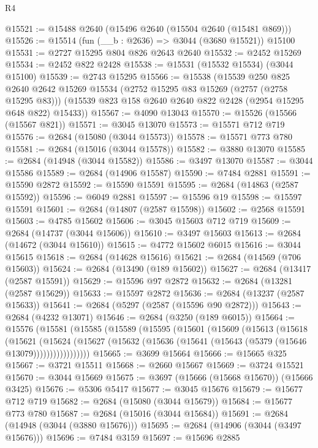 \begin{lexlean}{R4}
\begin{coremodule}
@15521 := @15488 @2640 (@15496 @2640 (@15504 @2640 (@15481 @869)))
@15526 := @15514 (fun (__b : @2636) => @3044 (@3680 @15521)) @15100
@15531 := @2727 @15295 @804 @826 @2643 @2640
@15532 := @2452 @15269
@15534 := @2452 @822 @2428
@15538 := @15531 (@15532 @15534) (@3044 @15100)
@15539 := @2743 @15295
@15566 := @15538
    (@15539
      @250
      @825
      @2640
      @2642
      @15269
      @15534
      (@2752 @15295 @83 @15269 (@2757 (@2758 @15295 @83)))
      (@15539 @823 @158 @2640 @2640 @822 @2428 (@2954 @15295 @648 @822) @15433))
@15567 := @4090 @13043
@15570 := @15526 (@15566 (@15567 @821))
@15571 := @3045 @13070
@15573 := @15571 @712 @719
@15576 := @2684 (@15080 (@3044 @15573))
@15578 := @15571 @773 @780
@15581 := @2684 (@15016 (@3044 @15578))
@15582 := @3880 @13070
@15585 := @2684 (@14948 (@3044 @15582))
@15586 := @3497 @13070
@15587 := @3044 @15586
@15589 := @2684 (@14906 @15587)
@15590 := @7484 @2881
@15591 := @15590 @2872
@15592 := @15590 @15591
@15595 := @2684 (@14863 (@2587 @15592))
@15596 := @6049 @2881
@15597 := @15596 @19
@15598 := @15597 @15591
@15601 := @2684 (@14807 (@2587 @15598))
@15602 := @2568 @15591
@15603 := @4785 @15602
@15606 := @3045 @15603 @712 @719
@15609 := @2684 (@14737 (@3044 @15606))
@15610 := @3497 @15603
@15613 := @2684 (@14672 (@3044 @15610))
@15615 := @4772 @15602 @6015
@15616 := @3044 @15615
@15618 := @2684 (@14628 @15616)
@15621 := @2684 (@14569 (@706 @15603))
@15624 := @2684 (@13490 (@189 @15602))
@15627 := @2684 (@13417 (@2587 @15591))
@15629 := @15596 @97 @2872
@15632 := @2684 (@13281 (@2587 @15629))
@15633 := @15597 @2872
@15636 := @2684 (@13237 (@2587 @15633))
@15641 := @2684 (@5297 (@2587 (@15596 @90 @2872)))
@15643 := @2684 (@4232 @13071)
@15646 := @2684 (@3250 (@189 @6015))
@15664 := @15576
    (@15581
      (@15585
        (@15589
          (@15595
            (@15601
              (@15609
                (@15613
                  (@15618
                    (@15621
                      (@15624
                        (@15627
                          (@15632 (@15636 (@15641 (@15643 (@5379 (@15646 @13079)))))))))))))))))
@15665 := @3699 @15664
@15666 := @15665 @325
@15667 := @3721 @15511
@15668 := @2660 @15667
@15669 := @3724 @15521
@15670 := @3044 @15669
@15675 := @3697 (@15666 (@15668 @15670)) (@15666 @3425)
@15676 := @5306 @5417
@15677 := @3045 @15676
@15679 := @15677 @712 @719
@15682 := @2684 (@15080 (@3044 @15679))
@15684 := @15677 @773 @780
@15687 := @2684 (@15016 (@3044 @15684))
@15691 := @2684 (@14948 (@3044 (@3880 @15676)))
@15695 := @2684 (@14906 (@3044 (@3497 @15676)))
@15696 := @7484 @3159
@15697 := @15696 @2885

\end{coremodule}
\end{lexlean}
